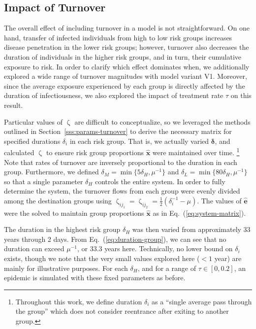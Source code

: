 \documentclass[10pt]{article}
\numberwithin{equation}{section}
\renewcommand{\zeta}{\upzeta}
\newcommand{\eq}[1]{Eq.~(\ref{#1})}
\begin{document}
\subsection{Impact of Turnover}\label{ss:exp-zeta}
The overall effect of including turnover in a model is not straightforward.
On one hand, transfer of infected individuals from high to low risk groups
increases disease penetration in the lower risk groups;
however, turnover also decreases the duration of individuals in the higher risk groups,
and in turn, their cumulative exposure to risk.
In order to clarify which effect dominates when,
we additionally explored a wide range of turnover magnitudes
with model variant V1.
Moreover, since the average exposure experienced by each group
is directly affected by the duration of infectiousness,
we also explored the impact of treatment rate $\tau$ on this result.
\par
Particular values of $\zeta$ are difficult to conceptualize,
so we leveraged the methods outlined in Section~\ref{sss:params-turnover}
to derive the necessary matrix for specified durations $\delta_i$ in each risk group.
That is, we actually varied $\bm{\delta}$,
and calculated $\zeta$ to ensure risk group proportions $\bm{\hat{x}}$ were maintained over time.%
\footnote{Throughout this work,
  we define duration $\delta_i$ as a ``single average pass through the group''
  which does not consider reentrance after exiting to another group.}
Note that rates of turnover are inversely proportional to the duration in each group.
Furthermore, we defined
$\delta_M = \min{\{ 5\delta_H,\mu^{-1}\}}$ and
$\delta_L = \min{\{80\delta_H,\mu^{-1}\}}$
so that a single parameter $\delta_H$ controls the entire system.
In order to fully determine the system,
the turnover flows from each group were evenly divided among the destination groups
using $\zeta_{ij_1} = \zeta_{ij_2} = \frac{1}{2}\left(\delta_i^{-1} - \mu\right)$.
The values of $\bm{\hat{e}}$ were the solved to maintain group proportions $\bm{\hat{x}}$
as in \eq{eq:system-matrix}.
\par
The duration in the highest risk group $\delta_H$ was then varied
from approximately 33 years through 2 days.
From \eq{eq:duration-group}, we can see that no duration can exceed $\mu^{-1}$,
or 33.3 years here.
Technically, no lower bound on $\delta_i$ exists,
though we note that the very small values explored here ($< 1$ year)
are mainly for illustrative purposes.
For each $\delta_H$, and for a range of $\tau \in [0,0.2]$,
an epidemic is simulated with these fixed parameters as before.
\end{document}
